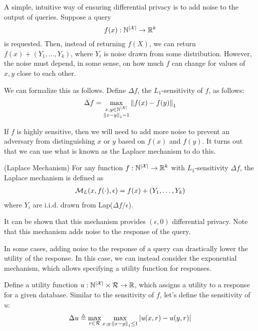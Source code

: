 \documentclass{article} %
\begin{document}
A simple, intuitive way of ensuring differential privacy is to add noise to the
output of queries. Suppose a query
\[ f(x) : \mathbb{N}^{\left\lvert\mathcal{X}\right\rvert} \rightarrow \mathbb{R}^k \]
is requested. Then, instead of
returning $f(X)$, we can return $f(x) + (Y_1, \dots, Y_k)$, where $Y_i$ is noise
drawn from some distribution. However, the noise must depend, in some sense, on
how much $f$ can change for values of $x, y$ close to each other.

We can formalize this as follows. Define $\Delta f$, the $L_1$-sensitivity of
$f$, as follows:
\begin{align*}
\Delta f = \max_{\substack{x, y \in \mathbb{N}^{\left\lvert\mathcal{X}\right\rvert} \\ \left\lVert x - y\right\rVert_1 = 1}}
                \left\lVert f(x) - f(y)\right\rVert_1
\end{align*}

If $f$ is highly sensitive, then we will need to add more noise to prevent an
adversary from distinguishing $x$ or $y$ based on $f(x)$ and $f(y)$. It turns
out that we can use what is known as the Laplace mechanism to do this.

\begin{definition}{(Laplace Mechanism)}
For any function $f : \mathbb{N}^{\left\lvert\mathcal{X}\right\rvert} \rightarrow \mathbb{R}^k$ with $L_1$-sensitivity
$\Delta f$, the Laplace mechanism is defined as
\begin{align*}
\mathcal{M}_L(x, f(\cdot), \epsilon) = f(x) + (Y_1, \dots, Y_k)
\end{align*}
where $Y_i$ are i.i.d. drawn from Lap($\Delta f / \epsilon$).
\label{def:laplace_mechanism}
\end{definition}

It can be shown that this mechanism provides $(\epsilon, 0)$ differential
privacy. Note that this mechanism adds noise to the response of the query.

In some cases, adding noise to the response of a query can drastically lower
the utility of the response. In this case, we can instead consider the
exponential mechanism, which allows specifying a utility function for responses.

Define a utility function $u : \mathbb{N}^{\left\lvert\mathcal{X}\right\rvert} \times \mathcal{R} \rightarrow \mathbb{R}$,
which assigns a utility to a response for a given database. Similar to the
sensitivity of $f$, let's define the sensitivity of $u$:
\begin{align*}
\Delta u \triangleq \max_{r \in \mathcal{R}} \max_{x, y : \left\lVert x - y\right\rVert_1 \leq 1} \left\lvert u(x, r) - u(y, r)\right\rvert
\end{align*}
\end{document}
